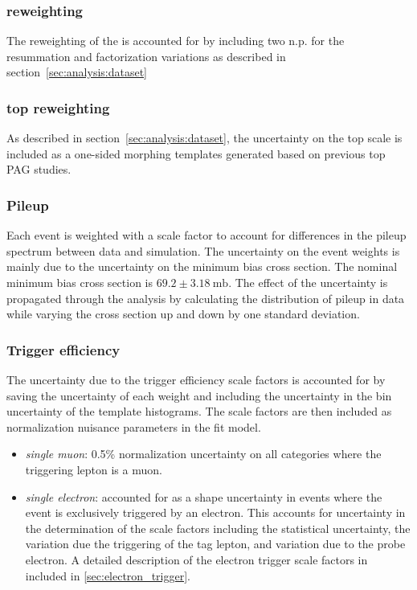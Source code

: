 \subsubsection{\WW \pt reweighting}

The reweighting of the \WW \pt is accounted for by including two n.p. for
the resummation and factorization variations as described in
section~\ref{sec:analysis:dataset}

\subsubsection{top \pt reweighting}

As described in section~\ref{sec:analysis:dataset}, the uncertainty on the top \pt
scale is included as a one-sided morphing templates generated based on
previous top PAG studies.

\subsubsection{Pileup}

Each event is weighted with a scale factor to account for differences in
the pileup spectrum between data and simulation.  The uncertainty on
the event weights is mainly due to the uncertainty on the minimum bias
cross section.  The nominal minimum bias cross section is $69.2 \pm
3.18~\text{mb}$. The effect of the uncertainty is propagated through the
analysis by calculating the distribution of pileup in data while varying
the cross section up and down by one standard deviation.  

\subsubsection{Trigger efficiency}

The uncertainty due to the trigger efficiency scale factors is
accounted for by saving the uncertainty of each weight and including the
uncertainty in the bin uncertainty of the template histograms.  The scale
factors are then included as normalization nuisance parameters in the
fit model.

\begin{itemize}
    \item \textit{single muon}: 0.5\% normalization uncertainty on all
        categories where the triggering lepton is a muon.
    \item \textit{single electron}: accounted for as a shape uncertainty
        in events where the event is exclusively triggered by an
        electron.  This accounts for uncertainty in the determination of
        the scale factors including the statistical uncertainty, the
        variation due the triggering of the tag lepton, and variation
        due to the probe electron.  A detailed description of the
        electron trigger scale factors in included in
        \ref{sec:electron_trigger}.
\end{itemize}

